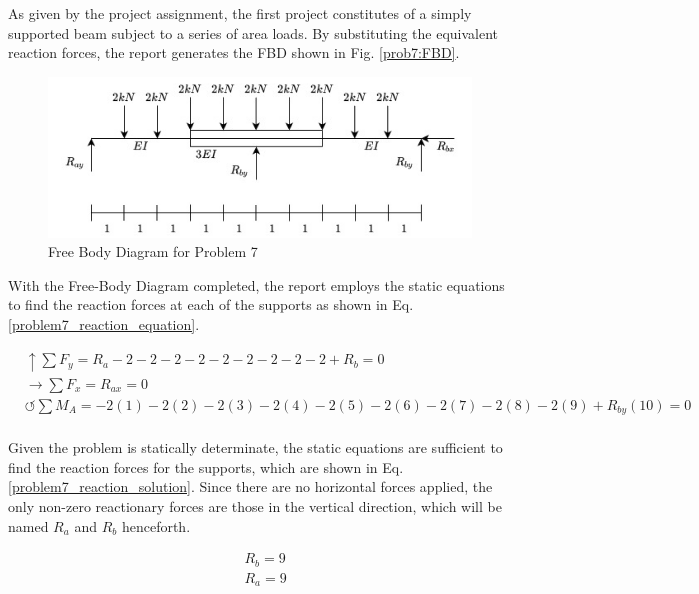 \documentclass[a4paper]{article}
\begin{document}
As given by the project assignment, the first project constitutes of a simply supported beam subject to a series of area loads. By substituting the equivalent reaction forces, the report generates the FBD shown in Fig. \ref{prob7:FBD}.

\begin{figure}[h]
\includegraphics[width=\textwidth]{FBD/FBD_7.jpg}
\caption{Free Body Diagram for Problem 7}
\label{FBD_7}
\end{figure}

With the Free-Body Diagram completed, the report employs the static equations to find the reaction forces at each of the supports as shown in Eq. \ref{problem7_reaction_equation}.

\begin{equation}
\begin{split}
	&\uparrow \sum F_y = R_a - 2 -2 -2 -2 -2 -2 -2 -2 -2 + R_b = 0 \\
 	&\rightarrow \sum F_x = R_{ax} = 0 \\
 	&\circlearrowleft \sum M_A = -2(1) - 2(2) -2(3) - 2(4) -2(5) - 2(6) - 2(7) - 2(8) -2(9) + R_{by}(10) = 0 \\
\end{split}
\label{problem7_reaction_equation}
\end{equation}

Given the problem is statically determinate, the static equations are sufficient to find the reaction forces for the supports, which are shown in Eq. \ref{problem7_reaction_solution}. Since there are no horizontal forces applied, the only non-zero reactionary forces are those in the vertical direction, which will be named $R_a$ and $R_b$ henceforth.

\begin{equation}
\begin{split}
	& R_b = 9 \\
	& R_a = 9 \\
\end{split}
\label{problem7_reaction_solution}
\end{equation}
\end{document}

